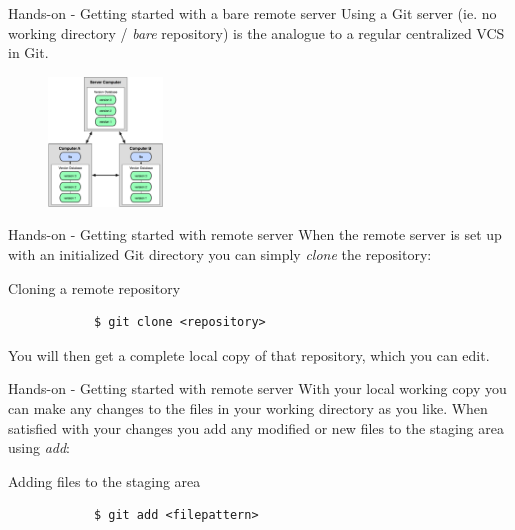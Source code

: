 \documentclass{beamer}
\def \figureHeight {130px}
\begin{document}
\begin{frame}[fragile]{Hands-on - Getting started with a bare remote server}
	Using a Git server (ie. no working directory / \emph{bare} repository) is the analogue to a regular centralized VCS in Git.
	\begin{figure}
		\includegraphics[height=\figureHeight]{images/distributed-version-control.png}
	\end{figure}
\end{frame}

\begin{frame}[fragile]{Hands-on - Getting started with remote server}
	When the remote server is set up with an initialized Git directory you can simply \emph{clone} the repository:
	\begin{exampleblock}{Cloning a remote repository}
		\begin{verbatim}
			$ git clone <repository>
		\end{verbatim}
	\end{exampleblock}
	You will then get a complete local copy of that repository, which you can edit.
\end{frame}

\begin{frame}[fragile]{Hands-on - Getting started with remote server}
	With your local working copy you can make any changes to the files in your working directory as you like. When satisfied with your changes you add any modified or new files to the staging area using \emph{add}:
	\begin{exampleblock}{Adding files to the staging area}
		\begin{verbatim}
			$ git add <filepattern>
		\end{verbatim}
	\end{exampleblock}
\end{frame}
\end{document}
